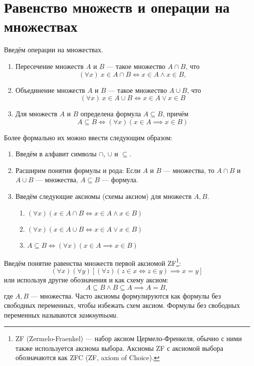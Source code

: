 \section{Равенство множеств и операции на множествах}

Введём операции на множествах.
\begin{enumerate}
	\item{}Пересечение множеств $A$ и $B$ --- такое множество $A\cap B$, что
	\[
		(\forall x)~x\in A\cap B\iff x\in A\land x\in B,
	\]

	\item{}Объединение множеств $A$ и $B$ --- такое множество $A\cup B$, что
	\[
		(\forall x)~x\in A\cup B\iff x\in A\lor x\in B
	\]

	\item{}Для множеств $A$ и $B$ определена формула $A\subseteq B$, причём
	\[
		A\subseteq B\iff (\forall x)(x\in A\implies x\in B)
	\]
\end{enumerate}

Более формально их можно ввести следующим образом:
\begin{enumerate}
	\item{}Введём в алфавит символы $\cap$, $\cup$ и $\subseteq$.
	\item{}Расширим понятия формулы и рода: Если $A$ и $B$ --- множества,
	то  $A\cap B$ и $A\cup B$ --- множества, $A\subseteq B$ --- формула.
	\item{}Введём следующие аксиомы (схемы аксиом) для множеств $A,B$.
	\begin{enumerate}
		\item{}$(\forall x)(x\in A\cap B\iff x\in A\land x\in B)$
		\item{}$(\forall x)(x\in A\cup B\iff x\in A\lor x\in B)$
		\item{}$A\subseteq B \iff (\forall x)(x\in A\implies x\in B)$
	\end{enumerate}
\end{enumerate}

Введём понятие равенства множеств первой аксиомой ZF\footnote{
	ZF (Zermelo-Fraenkel) --- набор аксиом Цермело-Френкеля, обычно с ними также
	используется аксиома выбора. Аксиомы ZF с аксиомой выбора
	обозначаются как ZFC (ZF, axiom of Choice).
}:
\[
	(\forall x)(\forall y)[(\forall z)(z\in x\iff z\in y)\implies x=y]
\]
или используя другие обозначения и как схему аксиом:
\[
	A\subseteq B\land B\subseteq A\implies A=B,
\]
где $A,B$ --- множества. Часто аксиомы формулируются как формулы без
свободных переменных, чтобы избежать схем аксиом.
Формулы без свободных переменных называются {\it замкнутыми}.

